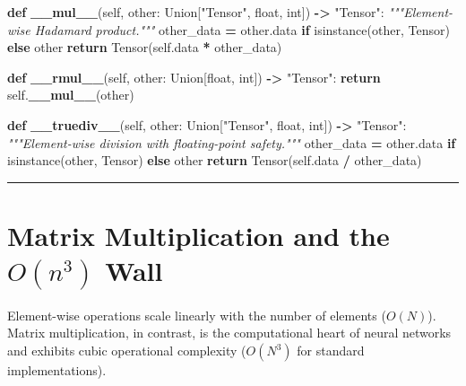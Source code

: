 \documentclass[
  letterpaper,
]{scrbook}
\newenvironment{Shaded}{\begin{snugshade}}{\end{snugshade}}
\newcommand{\BuiltInTok}[1]{#1}
\newcommand{\CommentTok}[1]{\textcolor[rgb]{0.56,0.35,0.01}{\textit{#1}}}
\newcommand{\ControlFlowTok}[1]{\textcolor[rgb]{0.13,0.29,0.53}{\textbf{#1}}}
\newcommand{\FunctionTok}[1]{\textcolor[rgb]{0.13,0.29,0.53}{\textbf{#1}}}
\newcommand{\KeywordTok}[1]{\textcolor[rgb]{0.13,0.29,0.53}{\textbf{#1}}}
\newcommand{\NormalTok}[1]{#1}
\newcommand{\OperatorTok}[1]{\textcolor[rgb]{0.81,0.36,0.00}{\textbf{#1}}}
\newcommand{\StringTok}[1]{\textcolor[rgb]{0.31,0.60,0.02}{#1}}
\newcommand{\VariableTok}[1]{\textcolor[rgb]{0.00,0.00,0.00}{#1}}
\begin{document}
\begin{Shaded}
\begin{Highlighting}[]
\KeywordTok{def} \FunctionTok{\_\_mul\_\_}\NormalTok{(}\VariableTok{self}\NormalTok{, other: Union[}\StringTok{"Tensor"}\NormalTok{, }\BuiltInTok{float}\NormalTok{, }\BuiltInTok{int}\NormalTok{]) }\OperatorTok{{-}\textgreater{}} \StringTok{"Tensor"}\NormalTok{:}
    \CommentTok{"""Element{-}wise Hadamard product."""}
\NormalTok{    other\_data }\OperatorTok{=}\NormalTok{ other.data }\ControlFlowTok{if} \BuiltInTok{isinstance}\NormalTok{(other, Tensor) }\ControlFlowTok{else}\NormalTok{ other}
    \ControlFlowTok{return}\NormalTok{ Tensor(}\VariableTok{self}\NormalTok{.data }\OperatorTok{*}\NormalTok{ other\_data)}

\KeywordTok{def} \FunctionTok{\_\_rmul\_\_}\NormalTok{(}\VariableTok{self}\NormalTok{, other: Union[}\BuiltInTok{float}\NormalTok{, }\BuiltInTok{int}\NormalTok{]) }\OperatorTok{{-}\textgreater{}} \StringTok{"Tensor"}\NormalTok{:}
    \ControlFlowTok{return} \VariableTok{self}\NormalTok{.}\FunctionTok{\_\_mul\_\_}\NormalTok{(other)}

\KeywordTok{def} \FunctionTok{\_\_truediv\_\_}\NormalTok{(}\VariableTok{self}\NormalTok{, other: Union[}\StringTok{"Tensor"}\NormalTok{, }\BuiltInTok{float}\NormalTok{, }\BuiltInTok{int}\NormalTok{]) }\OperatorTok{{-}\textgreater{}} \StringTok{"Tensor"}\NormalTok{:}
    \CommentTok{"""Element{-}wise division with floating{-}point safety."""}
\NormalTok{    other\_data }\OperatorTok{=}\NormalTok{ other.data }\ControlFlowTok{if} \BuiltInTok{isinstance}\NormalTok{(other, Tensor) }\ControlFlowTok{else}\NormalTok{ other}
    \ControlFlowTok{return}\NormalTok{ Tensor(}\VariableTok{self}\NormalTok{.data }\OperatorTok{/}\NormalTok{ other\_data)}
\end{Highlighting}
\end{Shaded}

\begin{center}\rule{0.5\linewidth}{0.5pt}\end{center}

\section{\texorpdfstring{Matrix Multiplication and the \(O(n^3)\)
Wall}{Matrix Multiplication and the O(n\^{}3) Wall}}\label{matrix-multiplication-and-the-on3-wall}

Element-wise operations scale linearly with the number of elements
(\(O(N)\)). Matrix multiplication, in contrast, is the computational
heart of neural networks and exhibits cubic operational complexity
(\(O(N^3)\) for standard implementations).
\end{document}
